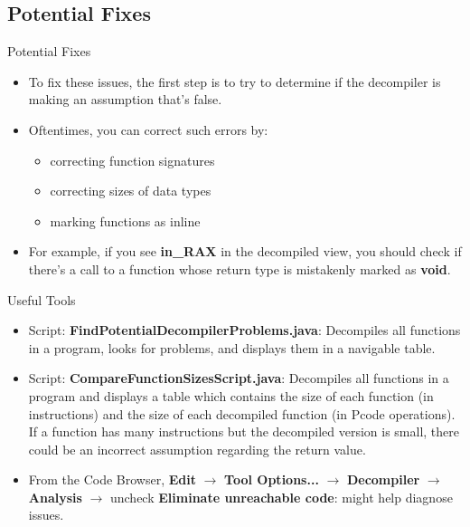 \documentclass{beamer}
\begin{document}
\subsection{Potential Fixes}
\begin{frame}
\begin{block}{Potential Fixes}
\begin{itemize}
\item To fix these issues, the first step is to try to determine if the decompiler is making an assumption that's false.
\item Oftentimes, you can correct such errors by:
\begin{itemize}
\item correcting function signatures
\item correcting sizes of data types
\item marking functions as inline
\end{itemize}
\item For example, if you see \textbf{in\_RAX} in the decompiled view, you should check if there's a call to a function whose return type is mistakenly marked as \textbf{void}.
\end{itemize}
\end{block}
\end{frame}

\begin{frame}
\begin{block}{Useful Tools}
\begin{itemize}
\item Script: \textbf{FindPotentialDecompilerProblems.java}: Decompiles all functions in a program, looks for problems, and displays them in a navigable table.
\item Script: \textbf{CompareFunctionSizesScript.java}: Decompiles all functions in a program and displays a table which contains the size of each function (in instructions) and
the size of each decompiled function (in Pcode operations). If a function has many instructions but the decompiled version is small, there could be an incorrect assumption regarding
the return value.
\item From the Code Browser, \textbf{Edit} $\rightarrow$ \textbf{Tool Options...} $\rightarrow$ \textbf{Decompiler} $\rightarrow$ \textbf{Analysis} $\rightarrow$ uncheck \textbf{Eliminate unreachable code}: might help diagnose issues.
\end{itemize}
\end{block}
\end{frame}
\end{document}
